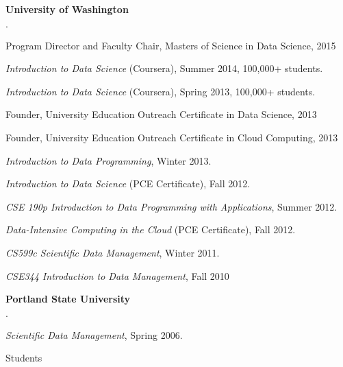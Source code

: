 \documentclass[10pt]{article}
\newenvironment{bulletlist}
   {
      \begin{list}
         {$\cdot$}
         {
            \setlength{\itemsep}{.5ex}
            \setlength{\parsep}{0ex}
            \setlength{\leftmargin}{0.7em}
            \setlength{\parskip}{0ex}
            \setlength{\topsep}{0ex}
         }
   }
   {
      \end{list}
   }
\newcommand{\marginlabel}[1]{
\begin{minipage}[b]{0.8\labelwidth}{\large \textsf{\textbf{#1}}}\end{minipage}}
\newcommand{\entrylabel}[1]{\mbox{\marginlabel{#1}}\hfill}
\newcommand{\MainListlabel}[1]
   {
      \parbox[t]{\labelwidth}{\hspace{.8em}\marginlabel{#1}}
   }
\newenvironment{MainList}[1]
   {
      \renewcommand{\entrylabel}{\MainListlabel}
      \begin{list}{}
      {
         \renewcommand{\makelabel}{\entrylabel}
         \setlength   {\itemindent}{-.65em}
         \setlength   {\labelwidth}{#1}
         \setlength   {\leftmargin}{\labelwidth}
         \setlength   {\itemsep}{3ex}
      }
   }
   {
      \end{list}
   }
\begin{document}
\begin{MainList}{88pt}
{\bf University of Washington}
\begin{bulletlist}
\item Program Director and Faculty Chair, Masters of Science in Data Science, 2015
\item {\em Introduction to Data Science} (Coursera), Summer 2014, 100,000+ students.
\item {\em Introduction to Data Science} (Coursera), Spring 2013, 100,000+ students.
\item Founder, University Education Outreach Certificate in Data Science, 2013
\item Founder, University Education Outreach Certificate in Cloud Computing, 2013
\item {\em Introduction to Data Programming}, Winter 2013.
\item {\em Introduction to Data Science} (PCE Certificate), Fall 2012.
\item {\em CSE 190p Introduction to Data Programming with Applications}, Summer 2012.
\item {\em Data-Intensive Computing in the Cloud}  (PCE Certificate), Fall 2012.
\item {\em CS599c Scientific Data Management}, Winter 2011.
\item {\em CSE344 Introduction to Data Management}, Fall 2010
\end{bulletlist}


{\bf Portland State University}
\begin{bulletlist}
\item {\em Scientific Data Management}, Spring 2006.
\end{bulletlist}

\item [Students]


\end{MainList}
\end{document}

